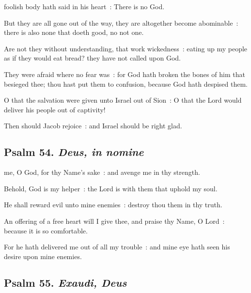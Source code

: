  foolish body hath said in his heart~: There is no God.\par
{}
But they are all gone out of the way, they are altogether become abominable~: there is also none that doeth good, no not one.\par
{}Are not they without understanding, that work wickedness~: eating up my people as if they would eat bread? they have not called upon God.\par
{}They were afraid where no fear was~: for God hath broken the bones of him that besieged thee; thou hast put them to confusion, because God hath despised them.\par
{}O that the salvation were given unto Israel out of Sion~: O that the Lord would deliver his people out of captivity!\par
{}Then should Jacob rejoice~: and Israel should be right glad.\par

\subsection{Psalm 54. \textit{Deus, in nomine}}

 me, O God, for thy Name's sake~: and avenge me in thy strength.\par
{}
Behold, God is my helper~: the Lord is with them that uphold my soul.\par
{}He shall reward evil unto mine enemies~: destroy thou them in thy truth.\par
{}An offering of a free heart will I give thee, and praise thy Name, O Lord~: because it is so comfortable.\par
{}For he hath delivered me out of all my trouble~: and mine eye hath seen his desire upon mine enemies.\par

\subsection{Psalm 55. \textit{Exaudi, Deus}}


